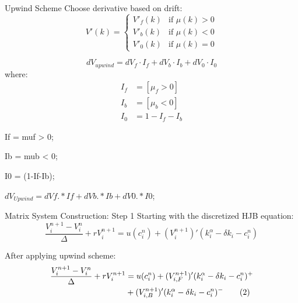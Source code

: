 \documentclass[]{beamer}
\newenvironment{code}{\begin{semiverbatim}\footnotesize}{\end{semiverbatim}}
\begin{document}
\begin{frame}{Upwind Scheme}
    Choose derivative based on drift:
        \[V'(k) = \begin{cases}
            V'_f(k) & \text{if } \mu(k) > 0\\
            V'_b(k) & \text{if } \mu(k) < 0\\
            V'_0(k) & \text{if } \mu(k) = 0
        \end{cases}\]

    \begin{equation}
        dV_{upwind} = dV_f \cdot I_f + dV_b \cdot I_b + dV_0 \cdot I_0 \tag{9}
    \end{equation}
    where:
    \begin{align}
        I_f &= [\mu_f > 0] \tag{10} \\
        I_b &= [\mu_b < 0] \tag{11} \\
        I_0 &= 1 - I_f - I_b \tag{12}
    \end{align}
    
    \begin{code}
    If = muf > 0;
    
    Ib = mub < 0;
    
    I0 = (1-If-Ib);
    
    $dV_{Upwind} = dVf.*If + dVb.*Ib + dV0.*I0$;
    \end{code}
\end{frame}


\begin{frame}{Matrix System Construction: Step 1}
    Starting with the discretized HJB equation:
    \begin{equation}
        \frac{V_i^{n+1} - V_i^n}{\Delta} + r V_i^{n+1} = u(c_i^n) + (V_i^{n+1})'(k_i^\alpha - \delta k_i - c_i^n) \tag{1}
    \end{equation}
    
    After applying upwind scheme:
    \begin{align}
        \frac{V_i^{n+1} - V_i^n}{\Delta} + r V_i^{n+1} &= u(c_i^n) + (V_{i,F}^{n+1})'(k_i^\alpha - \delta k_i - c_i^n)^+ \notag \\
        &+ (V_{i,B}^{n+1})'(k_i^\alpha - \delta k_i - c_i^n)^- \tag{2}
    \end{align}
    
\end{frame}
\end{document}
